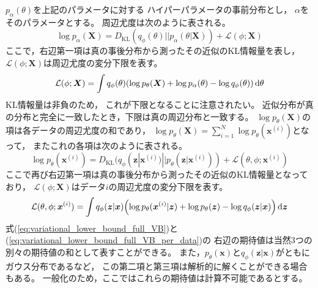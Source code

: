 \documentclass[dvipdfmx, fleqn]{jsarticle}
\begin{document}
\(p_{\alpha} (\theta)\)を上記のパラメータに対する
ハイパーパラメータの事前分布とし，
\(\alpha\)をそのパラメータとする。
周辺尤度は次のように表される。
\begin{equation}
    \log{p_{\alpha} (\bm{X})}
        = D_\mathrm{KL} (q_{\phi} (\theta) || p_{\alpha} (\theta | \bm{X}))
            + \mathcal{L}(\phi; \bm{X})
\end{equation}
ここで，右辺第一項は真の事後分布から測ったその近似のKL情報量を表し，
\(\mathcal{L}(\phi; \bm{X})\)は周辺尤度の変分下限を表す。
\begin{equation}
    \mathcal{L}(\phi; \bm{X}) = \int q_{\phi} (\theta) \qty(\log{p_{\theta} (\bm{X})} + \log{p_{\alpha} (\theta)} - \log{q_{\phi} (\theta)}) \dd{\theta}
    \label{eq:variational_lower_bound_full_VB}
\end{equation}
KL情報量は非負のため，
これが下限となることに注意されたい。
近似分布が真の分布と完全に一致したとき，下限は真の周辺分布と一致する。
\(\log{p_{\theta} (\bm{X})}\)の項は各データの周辺尤度の和であり，
\(\log{p_{\theta} (\bm{X})} = \sum_{i=1}^{N} \log{p_{\theta} (\bm{x}^{(i)})}\)となって，
またこれの各項は次のように表される。
\begin{equation}
    \log{p_{\theta} (\bm{x}^{(i)})} = D_\mathrm{KL} (q_{\phi} (\bm{z} | \bm{x}^{(i)}) || p_{\theta} (\bm{z} | \bm{x}^{(i)})) + \mathcal{L}(\theta, \phi; \bm{x}^{(i)})
\end{equation}
ここで再び右辺第一項は真の事後分布から測ったその近似のKL情報量となっており，
\(\mathcal{L}(\phi; \bm{X})\)はデータ\(i\)の周辺尤度の変分下限を表す。
\begin{equation}
    \mathcal{L}(\theta, \phi; \bm{x}^{(i)}) = \int q_{\phi} (\bm{z} | \bm{x}) \qty(\log{p_{\theta} (\bm{x}^{(i)} | \bm{z})} + \log{p_{\theta} (\bm{z})} - \log{q_{\phi} (\bm{z} | \bm{x})}) \dd{\bm{z}}
    \label{eq:variational_lower_bound_full_VB_per_data}
\end{equation}
式(\ref{eq:variational_lower_bound_full_VB})と(\ref{eq:variational_lower_bound_full_VB_per_data})の
右辺の期待値は当然3つの別々の期待値の和として表すことができる。
また，\(p_{\theta} (\bm{x})\)と\(q_{\phi} (\bm{z} | \bm{x})\)がともにガウス分布であるなど，
この第二項と第三項は解析的に解くことができる場合もある。
一般化のため，ここではこれらの期待値は計算不可能であるとする。
\end{document}
